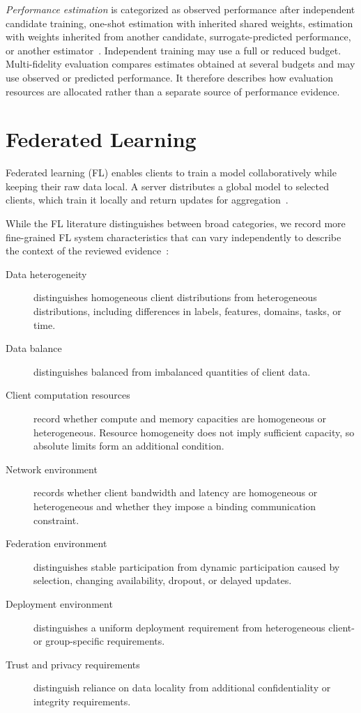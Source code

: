 \textit{Performance estimation} is categorized as observed performance after independent candidate training, one-shot estimation with inherited shared weights, estimation with weights inherited from another candidate, surrogate-predicted performance, or another estimator~\cite{nas_survey_2019,nas_1000_papers_2023}. Independent training may use a full or reduced budget. Multi-fidelity evaluation compares estimates obtained at several budgets and may use observed or predicted performance. It therefore describes how evaluation resources are allocated rather than a separate source of performance evidence.

\section{Federated Learning}

Federated learning (FL) enables clients to train a model collaboratively while keeping their raw data local. A server distributes a global model to selected clients, which train it locally and return updates for aggregation~\cite{fl_seminal_2017}. 

While the FL literature distinguishes between broad categories, we record more fine-grained FL system characteristics that can vary independently to describe the context of the reviewed evidence~\cite{fl_advances_and_open_problems_2021,fl_in_practice_reflections_2024}:

\begin{description}
    \item[Data heterogeneity] distinguishes homogeneous client distributions from heterogeneous distributions, including differences in labels, features, domains, tasks, or time.
    \item[Data balance] distinguishes balanced from imbalanced quantities of client data.
    \item[Client computation resources] record whether compute and memory capacities are homogeneous or heterogeneous. Resource homogeneity does not imply sufficient capacity, so absolute limits form an additional condition.
    \item[Network environment] records whether client bandwidth and latency are homogeneous or heterogeneous and whether they impose a binding communication constraint.
    \item[Federation environment] distinguishes stable participation from dynamic participation caused by selection, changing availability, dropout, or delayed updates.
    \item[Deployment environment] distinguishes a uniform deployment requirement from heterogeneous client- or group-specific requirements.
    \item[Trust and privacy requirements] distinguish reliance on data locality from additional confidentiality or integrity requirements.
\end{description}

